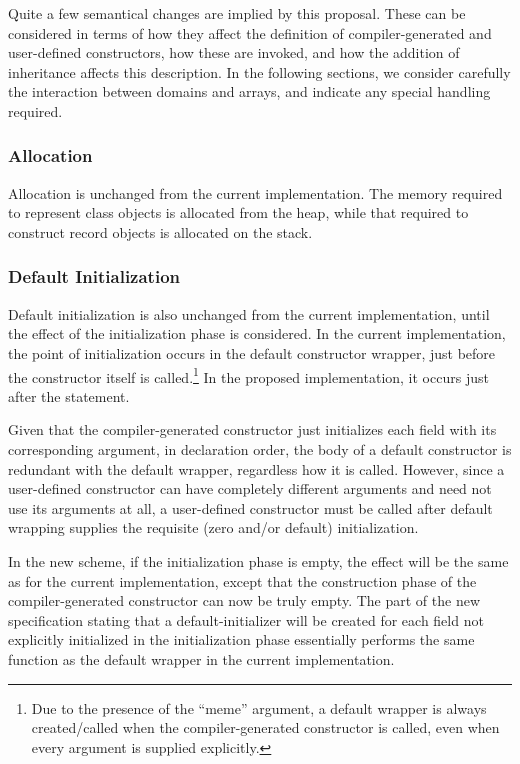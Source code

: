 Quite a few semantical changes are implied by this proposal.  These can be
considered in terms of how they affect the definition of compiler-generated and
user-defined constructors, how these are invoked, and how the addition of
inheritance affects this description.  In the following sections, we consider carefully the interaction
between domains and arrays, and indicate any special handling required.

\subsubsection{Allocation}

Allocation is unchanged from the current implementation.  The memory
required to represent class objects is allocated from the heap, while that
required to construct record objects is allocated on the stack.  

\subsubsection{Default Initialization} 
Default initialization is also unchanged from the current
implementation, until the effect of the initialization phase is considered.  In
the current implementation, the point of initialization occurs in the default
constructor wrapper, just before the constructor itself is called.\footnote{Due
to the presence of the ``meme'' argument, a default wrapper is always
created/called when the compiler-generated constructor is called, even when
every argument is supplied explicitly.}  In the proposed implementation, it
occurs just after the  statement.

Given that the compiler-generated
constructor just initializes each field with its corresponding argument, in
declaration order, the body of a default constructor is redundant with the
default wrapper, regardless how it is called.  However, since a user-defined
constructor can have completely different arguments and need not use its
arguments at all, a user-defined constructor must be called after default
wrapping supplies the requisite (zero and/or default) initialization.

In the new scheme, if the initialization phase is empty, the effect will
be the same as for the current implementation, except that the construction phase of the
compiler-generated constructor can now be truly empty.  The part of the
new specification stating that a default-initializer will be created for each
field not explicitly initialized in the initialization phase essentially
performs the same function as the default wrapper in the current implementation.

